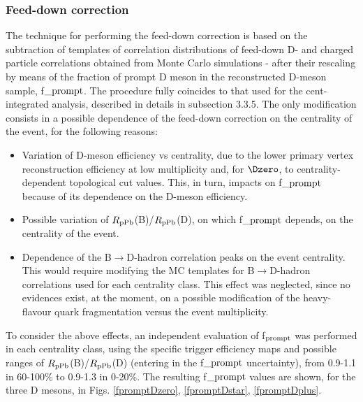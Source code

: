 \subsubsection{Feed-down correction}
The technique for performing the feed-down correction is based on the subtraction of templates of correlation distributions of feed-down D- and charged particle correlations obtained from Monte Carlo simulations - after their rescaling by means of the fraction of prompt D meson in the reconstructed D-meson sample, f$\_{\rm prompt}$.
The procedure fully coincides to that used for the cent-integrated analysis, described in details in subsection 3.3.5.
The only modification consists in a possible dependence of the feed-down correction on the centrality of the event, for the following reasons:
\begin{itemize}
  \item Variation of D-meson efficiency vs centrality, due to the lower primary vertex reconstruction efficiency at low multiplicity and, for $\Dzero$, to centrality-dependent topological cut values. This, in turn, impacts on f$\_{\rm prompt}$ because of its dependence on the D-meson efficiency.
  \item Possible variation of $R_{\rm pPb}$(B)/$R_{\rm pPb}$(D), on which f$\_{\rm prompt}$ depends, on the centrality of the event.
  \item Dependence of the B$\rightarrow$D-hadron correlation peaks on the event centrality. This would require modifying the MC templates for B$\rightarrow$D-hadron correlations used for each centrality class. This effect was neglected, since no evidences exist, at the moment, on a possible modification of the heavy-flavour quark fragmentation versus the event multiplicity.
\end{itemize}
To consider the above effects, an independent evaluation of f$_{\rm prompt}$ was performed in each centrality class, using the specific trigger efficiency maps and possible ranges of $R_{\rm pPb}$(B)/$R_{\rm pPb}$(D) (entering in the f$\_{\rm prompt}$ uncertainty), from 0.9-1.1 in 60-100\% to 0.9-1.3 in 0-20\%.
The resulting f$\_{\rm prompt}$ values are shown, for the three D mesons, in Figs. \ref{fpromptDzero}, \ref{fpromptDstar}, \ref{fpromptDplus}.

